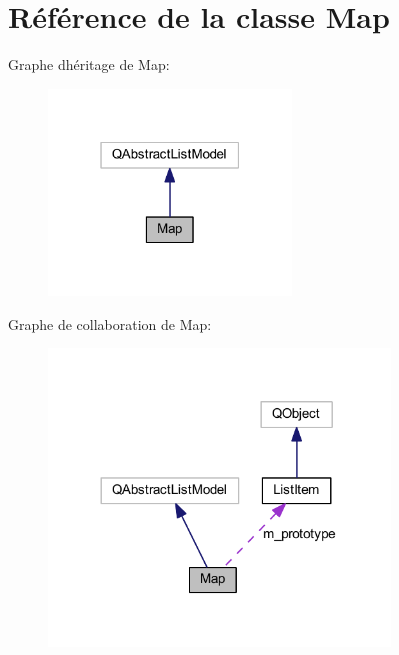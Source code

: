 \hypertarget{class_map}{}\section{Référence de la classe Map}
\label{class_map}


Graphe d\textquotesingle{}héritage de Map\+:
\nopagebreak
\begin{figure}[H]
\begin{center}
\leavevmode
\includegraphics[width=183pt]{class_map__inherit__graph}
\end{center}
\end{figure}


Graphe de collaboration de Map\+:
\nopagebreak
\begin{figure}[H]
\begin{center}
\leavevmode
\includegraphics[width=257pt]{class_map__coll__graph}
\end{center}
\end{figure}
